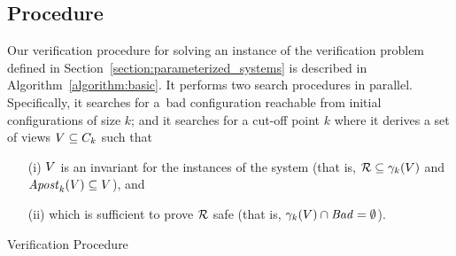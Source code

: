 \vspace{-5mm}
\subsection{Procedure}
\label{section:verification_method:procedure}
Our verification procedure for solving an instance of the verification problem defined in Section~\ref{section:parameterized_systems} is described in Algorithm~\ref{algorithm:basic}.
It performs two search procedures in parallel. 
Specifically, it searches for a~bad configuration reachable from initial configurations of size $k$; and it searches for a cut-off point $k$ where it derives a set of views $V\subseteq C_{k}$ such that 
\begin{itemize}%
\item [(i)] $V$ %
  is an invariant for the instances of the system
(that is, $\mathcal{R} \subseteq \gamma_{k}(V)$ and \\${\mathit{Apost}}_k(V) \subseteq {V}$), and
\item [(ii)] which is sufficient to prove $\mathcal{R}$ safe (that
  is, $\gamma_{k}(V) \cap\mathit{Bad} = \emptyset$).
\end{itemize}
\begin{algorithm}[h]
\DontPrintSemicolon
\caption{Verification Procedure}
\label{algorithm:basic}
\end{algorithm}
